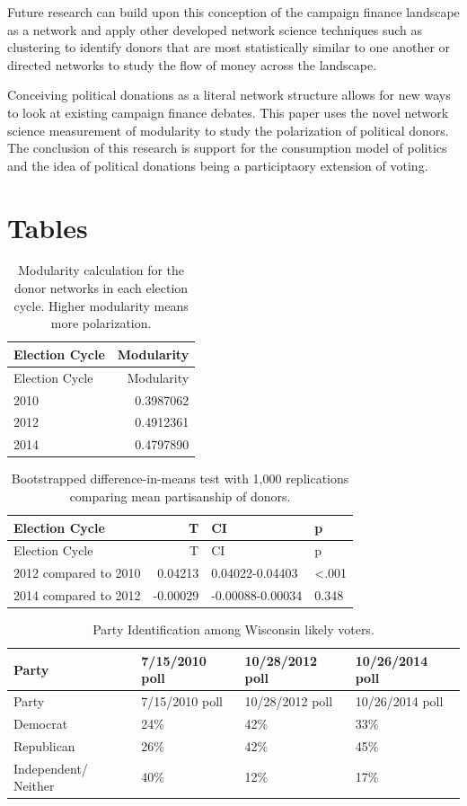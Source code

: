 \documentclass[12pt,]{article}
\begin{document}
Future research can build upon this conception of the campaign finance
landscape as a network and apply other developed network science
techniques such as clustering to identify donors that are most
statistically similar to one another or directed networks to study the
flow of money across the landscape.

Conceiving political donations as a literal network structure allows for
new ways to look at existing campaign finance debates. This paper uses
the novel network science measurement of modularity to study the
polarization of political donors. The conclusion of this research is
support for the consumption model of politics and the idea of political
donations being a participtaory extension of voting.

\newpage

\hypertarget{tables}{%
\section{Tables}\label{tables}}

\begin{longtable}[]{@{}lr@{}}
\caption{Modularity calculation for the donor networks in each election
cycle. Higher modularity means more polarization.}\tabularnewline
\toprule
Election Cycle & Modularity\tabularnewline
\midrule
\endfirsthead
\toprule
Election Cycle & Modularity\tabularnewline
\midrule
\endhead
2010 & 0.3987062\tabularnewline
2012 & 0.4912361\tabularnewline
2014 & 0.4797890\tabularnewline
\bottomrule
\end{longtable}

\newpage

\begin{longtable}[]{@{}lrll@{}}
\caption{Bootstrapped difference-in-means test with 1,000 replications
comparing mean partisanship of donors.}\tabularnewline
\toprule
Election Cycle & T & CI & p\tabularnewline
\midrule
\endfirsthead
\toprule
Election Cycle & T & CI & p\tabularnewline
\midrule
\endhead
2012 compared to 2010 & 0.04213 & 0.04022-0.04403 &
\textless.001\tabularnewline
2014 compared to 2012 & -0.00029 & -0.00088-0.00034 &
0.348\tabularnewline
\bottomrule
\end{longtable}

\newpage

\begin{longtable}[]{@{}llll@{}}
\caption{Party Identification among Wisconsin likely
voters.}\tabularnewline
\toprule
Party & 7/15/2010 poll & 10/28/2012 poll & 10/26/2014
poll\tabularnewline
\midrule
\endfirsthead
\toprule
Party & 7/15/2010 poll & 10/28/2012 poll & 10/26/2014
poll\tabularnewline
\midrule
\endhead
Democrat & 24\% & 42\% & 33\%\tabularnewline
Republican & 26\% & 42\% & 45\%\tabularnewline
Independent/ Neither & 40\% & 12\% & 17\%\tabularnewline
\bottomrule
\end{longtable}
\end{document}
